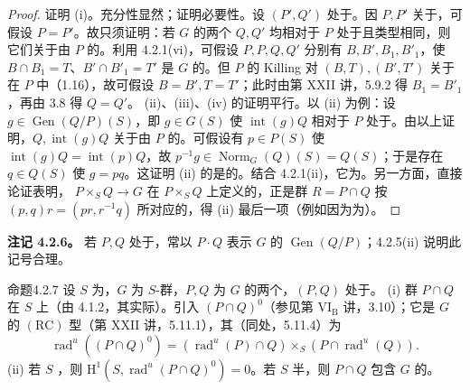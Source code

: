 \begin{proof}
证明 (i)。充分性显然；证明必要性。设 $(P',Q')$ 处于。因 $P,P'$ 关于，可假设 $P=P'$。故只须证明：若 $G$ 的两个 $Q,Q'$ 均相对于 $P$ 处于且类型相同，则它们关于由 $P$ 的。利用 4.2.1(vi)，可假设 $P,P,Q,Q'$ 分别有 $B,B',B_1,B'_1$，使 $B\cap B_1=T$、$B'\cap B'_1=T'$ 是 $G$ 的。但 $P$ 的 Killing 对 $(B,T),(B',T')$ 关于在 $P$ 中（1.16），故可假设 $B=B',T=T'$；此时由第 XXII 讲，5.9.2 得 $B_1=B'_1$，再由 3.8 得 $Q=Q'$。
(ii)、(iii)、(iv) 的证明平行。以 (ii) 为例：设 $g\in\operatorname{Gen}(Q/P)(S)$，即 $g\in G(S)$ 使 $\operatorname{int}(g)Q$ 相对于 $P$ 处于。由以上证明，$Q,\operatorname{int}(g)Q$ 关于由 $P$ 的。可假设有 $p\in P(S)$ 使 $\operatorname{int}(g)Q=\operatorname{int}(p)Q$，故 $p^{-1}g\in\operatorname{Norm}_G(Q)(S)=Q(S)$；于是存在 $q\in Q(S)$ 使 $g=pq$。这证明 (ii) 的是的。结合 4.2.1(ii)，它为。另一方面，直接论证表明， $P\times_SQ\to G$ 在 $P\times_SQ$ 上定义的，正是群 $R=P\cap Q$ 按 $(p,q)r=(pr,r^{-1}q)$ 所对应的，得 (ii) 最后一项（例如因为为）。
\end{proof}
\textbf{注记 4.2.6。} 若 $P,Q$ 处于，常以 $P\cdot Q$ 表示 $G$ 的 $\operatorname{Gen}(Q/P)$；4.2.5(ii) 说明此记号合理。
\begin{SGAresult}{命题}{4.2.7}
设 $S$ 为，$G$ 为 $S$-群，$P,Q$ 为 $G$ 的两个，$(P,Q)$ 处于。
(i) 群 $P\cap Q$ 在 $S$ 上（由 4.1.2，其实际）。引入 $(P\cap Q)^0$（参见第 VI$_{\mathrm B}$ 讲，3.10）；它是 $G$ 的 $(\mathrm{RC})$ 型（第 XXII 讲，5.11.1），其（同处，5.11.4）为
\[\operatorname{rad}^{u}((P\cap Q)^0)=(\operatorname{rad}^{u}(P)\cap Q)\times_S(P\cap\operatorname{rad}^{u}(Q)).\]
(ii) 若 $S$ ，则 $\mathrm H^1(S,\operatorname{rad}^{u}(P\cap Q)^0)=0$。若 $S$ 半，则 $P\cap Q$ 包含 $G$ 的。
\end{SGAresult}
